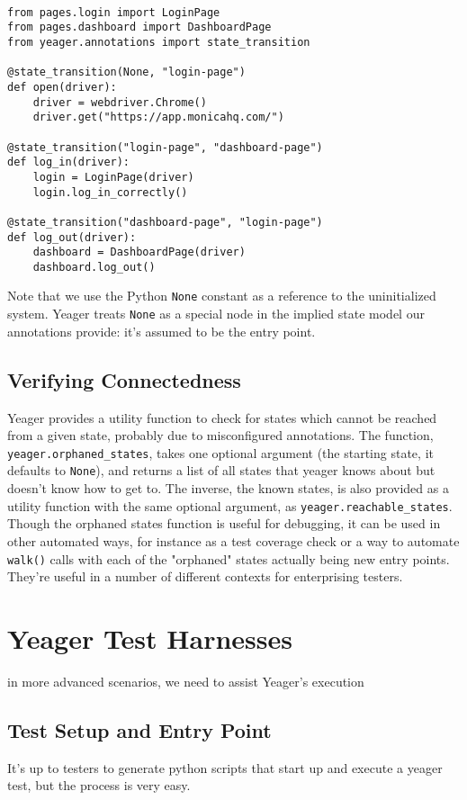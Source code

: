 {\tt
\begin{verbatim}
from pages.login import LoginPage
from pages.dashboard import DashboardPage
from yeager.annotations import state_transition

@state_transition(None, "login-page")
def open(driver):
    driver = webdriver.Chrome()
    driver.get("https://app.monicahq.com/")

@state_transition("login-page", "dashboard-page")
def log_in(driver):
    login = LoginPage(driver)
    login.log_in_correctly()

@state_transition("dashboard-page", "login-page")
def log_out(driver):
    dashboard = DashboardPage(driver)
    dashboard.log_out()
\end{verbatim}
}

Note that we use the Python \texttt{None} constant as a reference to the uninitialized system. Yeager treats \texttt{None} as a special node in the implied state model our annotations provide: it's assumed to be the entry point.

\subsection{Verifying Connectedness}
Yeager provides a utility function to check for states which cannot be reached from a given state, probably due to misconfigured annotations. The function, \texttt{yeager.orphaned\_states}, takes one optional argument (the starting state, it defaults to \texttt{None}), and returns a list of all states that yeager knows about but doesn't know how to get to. The inverse, the known states, is also provided as a utility function with the same optional argument, as \texttt{yeager.reachable\_states}. Though the orphaned states function is useful for debugging, it can be used in other automated ways, for instance as a test coverage check or a way to automate \texttt{walk()} calls with each of the "orphaned" states actually being new entry points. They're useful in a number of different contexts for enterprising testers.

\section{Yeager Test Harnesses}
in more advanced scenarios, we need to assist Yeager's execution %

\subsection{Test Setup and Entry Point}
It's up to testers to generate python scripts that start up and execute a yeager test, but the process is very easy.

